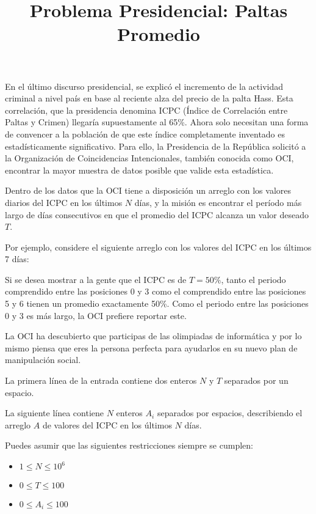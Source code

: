 \documentclass{oci}
\title{Problema Presidencial: Paltas Promedio}
\begin{document}
\begin{problemDescription}
En el último discurso presidencial, se explicó el incremento de la actividad
criminal a nivel país en base al reciente alza del precio de la palta Hass.
Esta correlación, que la presidencia denomina ICPC (Índice de Correlación entre
Paltas y Crimen) llegaría supuestamente al 65\%.
Ahora solo necesitan una forma de convencer a la población de que este índice 
completamente inventado es estadísticamente significativo.
Para ello, la Presidencia de la República solicitó a la Organización de
Coincidencias Intencionales, también conocida como OCI, encontrar la mayor
muestra de datos posible que valide esta estadística.

Dentro de los datos que la OCI tiene a disposición un arreglo con los valores
diarios del ICPC en los últimos $N$ días, y la misión es encontrar el período
más largo de días consecutivos en que el promedio del ICPC alcanza un valor
deseado $T$.

Por ejemplo, considere el siguiente arreglo con los valores del ICPC en los
últimos 7 días:
\begin{center}
\end{center}

Si se desea mostrar a la gente que el ICPC es de $T=50\%$, tanto el periodo
comprendido entre las posiciones 0 y 3 como el comprendido entre las posiciones
5 y 6 tienen un promedio exactamente 50\%.
Como el periodo entre las posiciones 0 y 3 es más largo, la OCI prefiere
reportar este.

La OCI ha descubierto que participas de las olimpiadas de informática y por lo mismo
piensa que eres la persona perfecta para ayudarlos en su nuevo plan de
manipulación social.
\end{problemDescription}

\begin{inputDescription}
  La primera línea de la entrada contiene dos enteros $N$ y $T$ separados por
  un espacio.

  La siguiente línea contiene $N$ enteros $A_i$ separados por espacios,
  describiendo el arreglo $A$ de valores del ICPC en los últimos $N$
  días.

  Puedes asumir que las siguientes restricciones siempre se cumplen:

  \begin{itemize}
  \item $1 \le N \le 10^6$

  \item $0 \le T \le 100$

  \item $0 \le A_i \le 100$
  \end{itemize}
\end{inputDescription}
\end{document}

